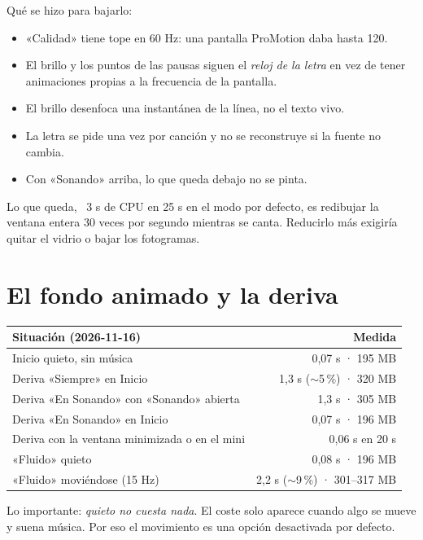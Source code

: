 Qué se hizo para bajarlo:

\begin{itemize}
  \item «Calidad» tiene tope en 60 Hz: una pantalla ProMotion daba hasta 120.
  \item El brillo y los puntos de las pausas siguen el \emph{reloj de la letra} en vez de tener
  animaciones propias a la frecuencia de la pantalla.
  \item El brillo desenfoca una instantánea de la línea, no el texto vivo.
  \item La letra se pide una vez por canción y no se reconstruye si la fuente no cambia.
  \item Con «Sonando» arriba, lo que queda debajo no se pinta.
\end{itemize}

Lo que queda, ~3 s de CPU en 25 s en el modo por defecto, es redibujar la ventana entera 30
veces por segundo mientras se canta. Reducirlo más exigiría quitar el vidrio o bajar los
fotogramas.

\section{El fondo animado y la deriva}

\begin{center}
\small
\begin{tabularx}{\linewidth}{@{}Xr@{}}
\toprule
Situación (2026-11-16) & Medida \\
\midrule
Inicio quieto, sin música & 0,07 s · 195 MB \\
Deriva «Siempre» en Inicio & 1,3 s ($\sim$5\,\%) · 320 MB \\
Deriva «En Sonando» con «Sonando» abierta & 1,3 s · 305 MB \\
Deriva «En Sonando» en Inicio & 0,07 s · 196 MB \\
Deriva con la ventana minimizada o en el mini & 0,06 s en 20 s \\
«Fluido» quieto & 0,08 s · 196 MB \\
«Fluido» moviéndose (15 Hz) & 2,2 s ($\sim$9\,\%) · 301--317 MB \\
\bottomrule
\end{tabularx}
\end{center}

Lo importante: \emph{quieto no cuesta nada}. El coste solo aparece cuando algo se mueve y
suena música. Por eso el movimiento es una opción desactivada por defecto.


